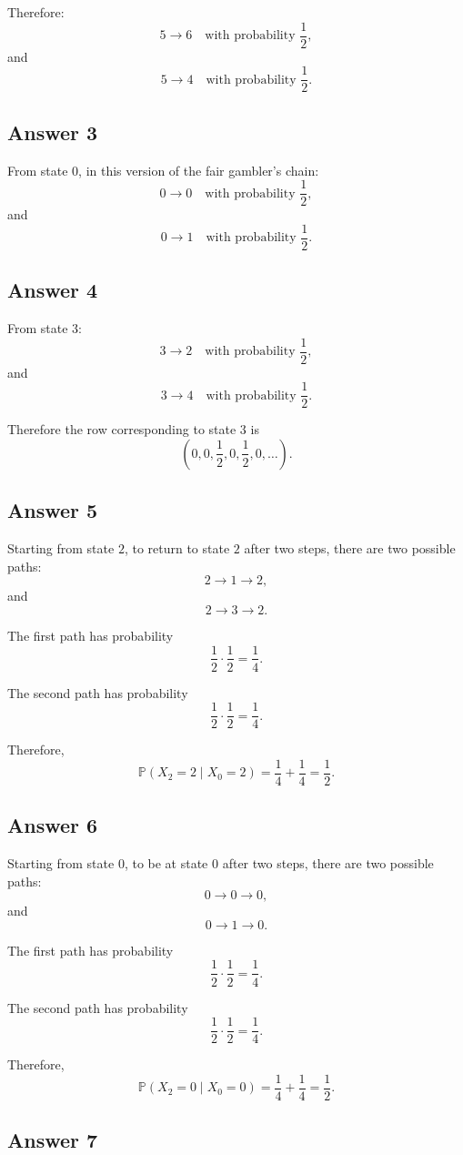 \documentclass[12pt,a4paper]{article}
\theoremstyle{notestyle}
\newcommand{\Prob}{\mathbb{P}}
\begin{document}
Therefore:
\[
5\to 6
\quad\text{with probability }\frac12,
\]
and
\[
5\to 4
\quad\text{with probability }\frac12.
\]

\subsection*{Answer 3}

From state $0$, in this version of the fair gambler's chain:
\[
0\to 0
\quad\text{with probability }\frac12,
\]
and
\[
0\to 1
\quad\text{with probability }\frac12.
\]

\subsection*{Answer 4}

From state $3$:
\[
3\to 2
\quad\text{with probability }\frac12,
\]
and
\[
3\to 4
\quad\text{with probability }\frac12.
\]

Therefore the row corresponding to state $3$ is
\[
(0,0,\frac12,0,\frac12,0,\ldots).
\]

\subsection*{Answer 5}

Starting from state $2$, to return to state $2$ after two steps, there are two possible paths:
\[
2\to 1\to 2,
\]
and
\[
2\to 3\to 2.
\]

The first path has probability
\[
\frac12\cdot\frac12=\frac14.
\]

The second path has probability
\[
\frac12\cdot\frac12=\frac14.
\]

Therefore,
\[
\Prob(X_2=2\mid X_0=2)
=
\frac14+\frac14
=
\frac12.
\]

\subsection*{Answer 6}

Starting from state $0$, to be at state $0$ after two steps, there are two possible paths:
\[
0\to 0\to 0,
\]
and
\[
0\to 1\to 0.
\]

The first path has probability
\[
\frac12\cdot\frac12=\frac14.
\]

The second path has probability
\[
\frac12\cdot\frac12=\frac14.
\]

Therefore,
\[
\Prob(X_2=0\mid X_0=0)
=
\frac14+\frac14
=
\frac12.
\]

\subsection*{Answer 7}
\end{document}
